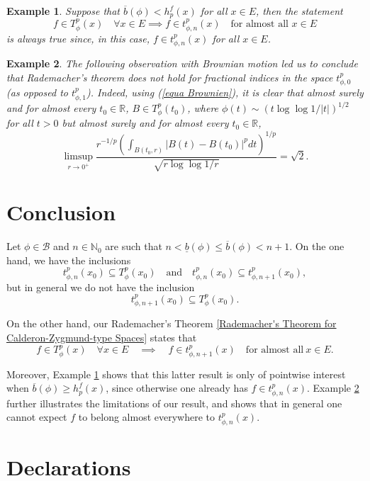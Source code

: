 \documentclass[a4paper,10pt]{article}
\theoremstyle{thmstyleone}%
\theoremstyle{thmstyletwo}%
\newtheorem{example}{Example}%
\theoremstyle{thmstylethree}%
\begin{document}
\begin{example}\label{Example 1}
Suppose that $\overline{b}(\phi)<h_p^f(x)$ for all $x\in E$, then the statement
\[f\in T^p_\phi(x) \quad\forall x\in E\implies f\in t^p_{\phi,n}(x) \quad\text{for almost all }x\in E\]
is always true since, in this case, $f\in t^p_{\phi,n}(x)$ for all $x\in E$.
\end{example}

\begin{example}\label{Example 2}
The following observation with Brownian motion led us to conclude that Rademacher's theorem does not hold for fractional indices in the space $t^p_{\phi,0}$ (as opposed to $t^p_{\phi,1}$). Indeed, using (\ref{equa Brownien}), it is clear that almost surely and for almost every $t_0 \in \mathbb{R}$, $B\in T^p_\phi(t_0)$, where $\phi(t)\sim (t \log \log 1/|t|)^{1/2}$ for all $t>0$ but 
almost surely and for almost every $t_0 \in \mathbb{R}$, 
\[\limsup_{r\rightarrow 0^+}\frac{r^{-1/p}(\int_{B(t_0,r)}|B(t)-B(t_0)|^pdt)^{1/p}}{\sqrt{r\log \log 1/r}}=\sqrt{2}. \]
\end{example}

\section{Conclusion}
Let $\phi\in\mathcal{B}$ and $n\in\mathbb{N}_0$ are such that $n<\underline{b}(\phi)\leq \overline{b}(\phi)<n+1$. On the one hand, we have the inclusions
\[
t^p_{\phi,n}(x_0) \subseteq T^p_{\phi}(x_0)
\quad \text{and} \quad
t^p_{\phi,n}(x_0) \subseteq t^p_{\phi,n+1}(x_0),
\]
but in general we do not have the inclusion
\[
t^p_{\phi,n+1}(x_0) \subseteq T^p_{\phi}(x_0).
\]

On the other hand, our Rademacher's Theorem \ref{Rademacher's Theorem for Calderon-Zygmund-type Spaces} states that
\[
f \in T^p_\phi(x) \,\,\,\,\,\, \forall x \in E
\quad \implies \quad
f \in t^p_{\phi,n+1}(x) \quad \text{for almost all} \ x \in E.
\]

Moreover, Example \ref{Example 1} shows that this latter result is only of pointwise interest when 
$\overline{b}(\phi) \geq h_p^f(x)$, since otherwise one already has 
$f \in t^p_{\phi,n}(x)$. Example \ref{Example 2} further illustrates the limitations of our result, and shows that in general one cannot expect $f$ to belong almost everywhere to $t^p_{\phi,n}(x)$.

\section*{Declarations}
\end{document}
